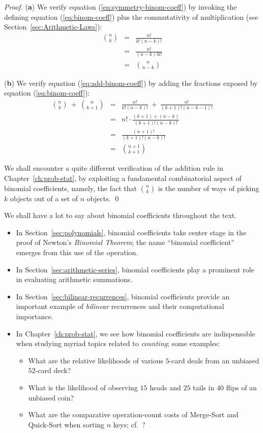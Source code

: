 \begin{proof}
({\bf a})
We verify equation (\ref{eq:symmetry-binom-coeff}) by invoking the defining equation (\ref{eq:binom-coeff}) plus the commutativity of multiplication (see Section~\ref{sec:Arithmetic-Laws}):
\begin{eqnarray*}
{n \choose k} & = & \frac{n!}{k!(n-k)!} \\
              & = & \frac{n!}{(n-k)!k!} \\
              & = & {n \choose {n-k}}
\end{eqnarray*}

\noindent ({\bf b})
We verify equation (\ref{eq:add-binom-coeff}) by adding the fractions exposed by equation (\ref{eq:binom-coeff}):
\begin{eqnarray*}
{n \choose k} \ + \ {n \choose {k+1}}
  & = &
\frac{n!}{k!(n-k)!} \ + \ \frac{n!}{(k+1)!(n-k-1)!} \\
  & = &
n! \cdot \frac{(k+1) + (n-k)} {(k+1)!(n-k)!} \\
  & = & 
\frac{(n+1)!}{(k+1)!(n-k)!} \\
  & = &
{{n+1} \choose {k+1}}
\end{eqnarray*}

\medskip

We shall encounter a quite different verification of the addition rule in Chapter~\ref{ch:prob-stat}, by exploiting a fundamental combinatorial aspect of binomial coefficients, namely, the fact that $\displaystyle {n \choose k}$ is the number of ways of picking $k$ objects out of a set of $n$ objects.  \qed
\end{proof}

\bigskip

\noindent
We shall have a lot to say about binomial coefficients throughout the text.
\begin{itemize}
\item
In Section~\ref{sec:polynomials}, binomial coefficients take center stage in the proof of Newton's {\it Binomial Theorem}; the name ``binomial coefficient'' emerges from this use of the operation.
\item
In Section~\ref{sec:arithmetic-series}, binomial coefficients play a prominent role in evaluating arithmetic summations.
\item
In Section~\ref{sec:bilinear-recurrences}, binomial coefficients provide an important example of {\em bilinear} recurrences and their computational importance.
\item
In Chapter~\ref{ch:prob-stat}, we see how binomial coefficients are indispensable when studying myriad topics related to {\em counting}; some examples:
  \begin{itemize}
  \item
What are the relative likelihoods of various $5$-card deals from an unbiased $52$-card deck?
  \item
What is the likelihood of observing $15$ {\sc head}s and $25$ {\sc tail}s in $40$ flips of an unbiased coin?
  \item
What are the comparative operation-count costs of Merge-Sort and Quick-Sort when sorting $n$ keys; cf.~\cite{CLRS}?
  \end{itemize}
\end{itemize}


